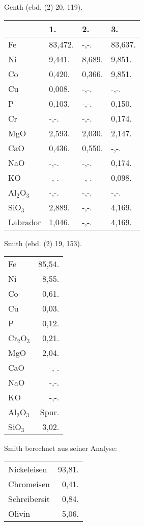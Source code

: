 \documentclass[a4paper, 11pt, oneside]{article}
\begin{document}
Genth (ebd. (2) 20, 119).
\begin{table}[H]
    \centering\swabfamily\Large
    \begin{tabular}{l l l l}
         & 1. & 2. & 3. \\ \hline
        Fe & 83,472. & -,-. & 83,637. \\
        Ni & 9,441. & 8,689. & 9,851. \\
        Co & 0,420. & 0,366. & 9,851. \\
        Cu & 0,008. & -,-. & -,-. \\
        P & 0,103. & -,-. & 0,150. \\
        Cr & -,-. & -,-. & 0,174. \\
        MgO & 2,593. & 2,030. & 2,147. \\
        CaO & 0,436. & 0,550. & -,-. \\
        NaO & -,-. & -,-. & 0,174. \\
        KO & -,-. & -,-. & 0,098. \\
        Al$_{2}$O$_{3}$ & -,-. & -,-. & -,-. \\
        SiO$_{3}$ & 2,889. & -,-. & 4,169. \\
        Labrador & 1,046. & -,-. & 4,169. \\
    \end{tabular}
\end{table}

Smith (ebd. (2) 19, 153).
\begin{table}[H]
    \centering\swabfamily\Large
    \begin{tabular}{l r}
        Fe & 85,54. \\
        Ni & 8,55. \\
        Co & 0,61. \\
        Cu & 0,03. \\
        P & 0,12. \\
        Cr$_{2}$O$_{3}$ & 0,21. \\
        MgO & 2,04. \\
        CaO & -,-. \\
        NaO & -,-. \\
        KO & -,-. \\
        Al$_{2}$O$_{3}$ & Spur. \\
        SiO$_{3}$ & 3,02. \\
    \end{tabular}
\end{table}

Smith berechnet aus seiner Analyse:
\begin{table}[H]
    \centering\swabfamily\Large
    \begin{tabular}{l r}
        Nickeleisen & 93,81. \\
        Chromeisen & 0,41. \\
        Schreibersit & 0,84. \\
        Olivin & 5,06. \\
    \end{tabular}
\end{table}
\end{document}
